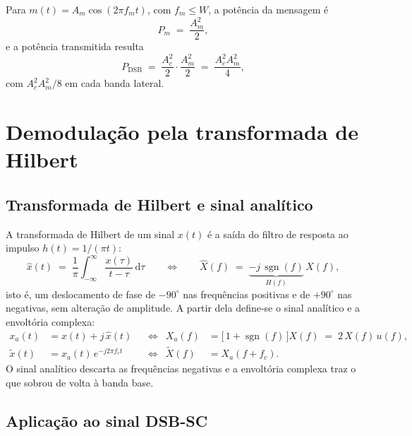 \documentclass[11pt,a4paper]{article}
\newcommand{\DSB}{\text{DSB}}
\newcommand{\dd}{\,\mathrm{d}}
\DeclareMathOperator{\sgn}{sgn}
\begin{document}
\begin{exemplo}
Para $m(t) = A_m\cos(2\pi f_m t)$, com $f_m \le W$, a potência da mensagem é
\[
  P_m \;=\; \frac{A_m^{2}}{2},
\]
e a potência transmitida resulta
\[
  P_{\DSB} \;=\; \frac{A_c^{2}}{2}\cdot\frac{A_m^{2}}{2} \;=\; \frac{A_c^{2}A_m^{2}}{4},
\]
com $A_c^{2}A_m^{2}/8$ em cada banda lateral.
\end{exemplo}


\section{Demodulação pela transformada de Hilbert}

\subsection{Transformada de Hilbert e sinal analítico}

A transformada de Hilbert de um sinal $x(t)$ é a saída do filtro de resposta ao impulso $h(t) = 1/(\pi t)$:
\begin{equation}
  \hat{x}(t) \;=\; \frac{1}{\pi}\int_{-\infty}^{\infty}\frac{x(\tau)}{t-\tau}\dd\tau
  \qquad\Longleftrightarrow\qquad
  \hat{X}(f) \;=\; \underbrace{-j\,\sgn(f)}_{H(f)}\, X(f),
  \label{eq:hilbert_def}
\end{equation}
isto é, um deslocamento de fase de $-90^{\circ}$ nas frequências positivas e de $+90^{\circ}$ nas negativas, sem alteração de amplitude. A partir dela define-se o sinal analítico e a envoltória complexa:
\begin{align}
  x_a(t) &= x(t) + j\,\hat{x}(t)
  &&\Longleftrightarrow&
  X_a(f) &= \bigl[\,1 + \sgn(f)\,\bigr] X(f) \;=\; 2\,X(f)\,u(f),
  \label{eq:analitico}\\[0.3em]
  \tilde{x}(t) &= x_a(t)\, e^{-j2\pi f_c t}
  &&\Longleftrightarrow&
  \tilde{X}(f) &= X_a(f+f_c).
  \label{eq:envoltoria_complexa}
\end{align}
O sinal analítico descarta as frequências negativas e a envoltória complexa traz o que sobrou de volta à banda base.

\subsection{Aplicação ao sinal DSB-SC}
\end{document}
